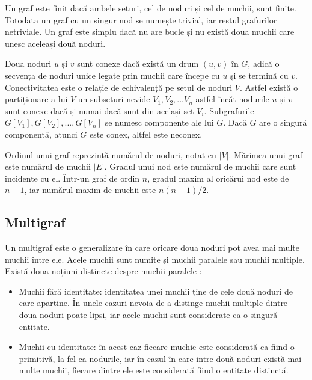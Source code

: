 Un graf este finit dacă ambele seturi, cel de noduri și cel de muchii, sunt finite. Totodata un graf cu un singur nod se numește trivial, iar restul grafurilor netriviale.
Un graf este simplu dacă nu are bucle și nu există doua muchii care unesc aceleași două noduri.\newline

Doua noduri \(u\) și \(v\) sunt conexe dacă există un drum \((u,v)\) în \(G\), adică o secvența de noduri unice legate prin muchii care începe cu \(u\) și se termină cu \(v\).
Conectivitatea este o relație de echivalență pe setul de noduri \(V\). Astfel există o partiționare a lui \(V\) un subseturi nevide \(V_1,V_2,...V_n\) astfel încăt nodurile \(u\) și \(v\)
sunt conexe dacă și numai dacă sunt din același set \(V_i\). Subgrafurile \(G[V_1], G[V_2], ... , G[V_n]\) se numesc componente ale lui \(G\). Dacă \(G\) are o singură componentă, atunci
\(G\) este conex, altfel este neconex.\newline

Ordinul unui graf reprezintă numărul de noduri, notat cu \(|V|\). Mărimea unui graf este numărul de muchii \(|E|\).
Gradul unui nod este numărul de muchii care sunt incidente cu el.
Într-un graf de ordin \(n\), gradul maxim al oricărui nod este de \(n-1\), iar numărul maxim de muchii este \(n(n-1)/2\).

\subsection{Multigraf}

Un multigraf este o generalizare în care oricare doua noduri pot avea mai multe muchii între ele. Acele muchii sunt numite și muchii paralele sau muchii multiple.
Există doua noțiuni distincte despre muchii paralele \cite{graf3}:\newline

\begin{itemize}
\item Muchii fără identitate: identitatea unei muchii ține de cele două noduri de care aparține. 
În unele cazuri nevoia de a distinge muchii multiple dintre doua noduri poate lipsi, iar acele muchii sunt considerate ca o 
singură entitate.\newline
\item Muchii cu identitate: în acest caz fiecare muchie este considerată ca fiind o primitivă, la fel ca nodurile, 
iar în cazul în care intre două noduri există mai multe muchii, fiecare dintre ele este considerată fiind o entitate distinctă.\newline
\end{itemize}

